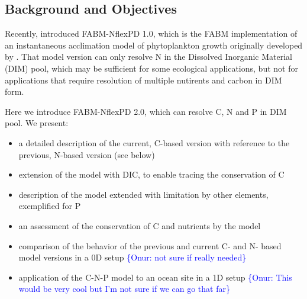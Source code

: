 \documentclass[gmd, manuscript]{copernicus}
\newcommand{\onur}[1]{\textcolor{blue}{\{Onur: #1\}}}
\begin{document}
\subsection{Background and Objectives}
Recently, \citet{Kerimoglu2021} introduced FABM-NflexPD 1.0, which is the FABM \citep[Framework for Aquatic Biogeochemical Models][]{Bruggeman2014} implementation of an instantaneous acclimation model of phytoplankton growth originally developed by \citet{Smith2016}. That model version can only resolve N in the Dissolved Inorganic Material (DIM) pool, which may be sufficient for some ecological applications, %
but not for applications that require resolution of multiple nutirents and carbon in DIM form.

Here we introduce FABM-NflexPD 2.0, which can resolve C, N and P in DIM pool. We present:
\begin{itemize}
 \item a detailed description of the current, C-based version with reference to the previous, N-based version (see below)
 \item extension of the model with DIC, to enable tracing the conservation of C
 \item description of the model extended with limitation by other elements, exemplified for P
 \item an assessment of the conservation of C and nutrients by the model
 \item comparison of the behavior of the previous and current C- and N- based model versions in a 0D setup \onur{not sure if really needed} %
 \item application of the C-N-P model to an ocean site in a 1D setup \onur{This would be very cool but I'm not sure if we can go that far}
\end{itemize}

\end{document}
